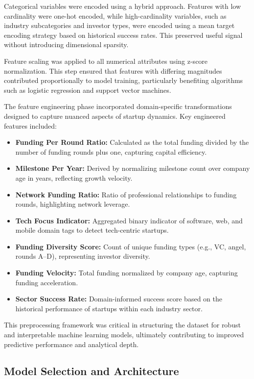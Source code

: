 \documentclass[conference]{IEEEtran}
\begin{document}
Categorical variables were encoded using a hybrid approach. Features with low cardinality were one-hot encoded, while high-cardinality variables, such as industry subcategories and investor types, were encoded using a mean target encoding strategy based on historical success rates. This preserved useful signal without introducing dimensional sparsity.

Feature scaling was applied to all numerical attributes using z-score normalization. This step ensured that features with differing magnitudes contributed proportionally to model training, particularly benefiting algorithms such as logistic regression and support vector machines.

The feature engineering phase incorporated domain-specific transformations designed to capture nuanced aspects of startup dynamics. Key engineered features included:

\begin{itemize}
    \item \textbf{Funding Per Round Ratio:} Calculated as the total funding divided by the number of funding rounds plus one, capturing capital efficiency.
    \item \textbf{Milestone Per Year:} Derived by normalizing milestone count over company age in years, reflecting growth velocity.
    \item \textbf{Network Funding Ratio:} Ratio of professional relationships to funding rounds, highlighting network leverage.
    \item \textbf{Tech Focus Indicator:} Aggregated binary indicator of software, web, and mobile domain tags to detect tech-centric startups.
    \item \textbf{Funding Diversity Score:} Count of unique funding types (e.g., VC, angel, rounds A–D), representing investor diversity.
    \item \textbf{Funding Velocity:} Total funding normalized by company age, capturing funding acceleration.
    \item \textbf{Sector Success Rate:} Domain-informed success score based on the historical performance of startups within each industry sector.
\end{itemize}

This preprocessing framework was critical in structuring the dataset for robust and interpretable machine learning models, ultimately contributing to improved predictive performance and analytical depth.


\subsection{Model Selection and Architecture}
\end{document}
